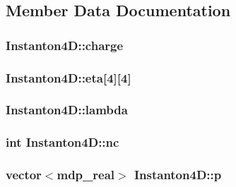 \subsection{Member Data Documentation}
\hypertarget{class_instanton4_d_a81408020baf1ea808456d691c65425e2}{
\subsubsection[{charge}]{ {\bf Instanton4D::charge}}}
\label{class_instanton4_d_a81408020baf1ea808456d691c65425e2}
\hypertarget{class_instanton4_d_ae318efcecc72b47fb7b43bcf0222697f}{
\subsubsection[{eta}]{ {\bf Instanton4D::eta}\mbox{[}4\mbox{]}\mbox{[}4\mbox{]}}}
\label{class_instanton4_d_ae318efcecc72b47fb7b43bcf0222697f}
\hypertarget{class_instanton4_d_a69a7961ae8d9ea823cacbf8cc11bc46f}{
\subsubsection[{lambda}]{ {\bf Instanton4D::lambda}}}
\label{class_instanton4_d_a69a7961ae8d9ea823cacbf8cc11bc46f}
\hypertarget{class_instanton4_d_af8271a542264493caafca9443b0c2f38}{
\subsubsection[{nc}]{\setlength{\rightskip}{0pt plus 5cm}int {\bf Instanton4D::nc}}}
\label{class_instanton4_d_af8271a542264493caafca9443b0c2f38}
\hypertarget{class_instanton4_d_a3d78aada54a0f8e7bafb5272cb5ca401}{
\subsubsection[{p}]{\setlength{\rightskip}{0pt plus 5cm}vector$<${\bf mdp\_\-real}$>$ {\bf Instanton4D::p}}}
\label{class_instanton4_d_a3d78aada54a0f8e7bafb5272cb5ca401}
